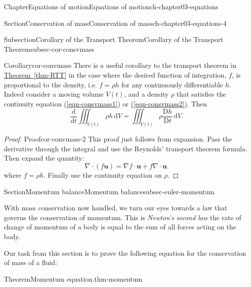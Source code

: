 \documentclass[oneside,10pt,]{book}
\newcommand{\xreffont}{\relax}
\numberwithin{equation}{section}
\newcommand{\de}{\mathrm{d}}
\newcommand{\dd}[2]{\frac{\de#1}{\de#2}}
\newcommand{\DD}[2]{\frac{\mathrm{D}#1}{\mathrm{D}#2}}
\newcommand{\bu}{\boldsymbol{u}}
\begin{document}
\begin{chapterptx}{Chapter}{Equations of motion}{}{Equations of motion}{}{}{ch-chapter03-equations}
\begin{sectionptx}{Section}{Conservation of mass}{}{Conservation of mass}{}{}{ch-chapter03-equations-4}
\typeout{************************************************}
%
\begin{subsectionptx}{Subsection}{Corollary of the Transport Theorem}{}{Corollary of the Transport Theorem}{}{}{subsec-cor-consvmass}
\begin{corollary}{Corollary}{}{}{cor-convmass}%
There is a useful corollary to the transport theorem in \hyperref[thm-RTT]{Theorem~{\xreffont\ref{thm-RTT}}} in the case where the desired function of integration, \(f\), is proportional to the density, i.e. \(f = \rho h\) for any continuously differentiable \(h\). Indeed consider a moving volume \(V(t)\), and a density \(\rho\) that satisfies the continuity equation \hyperref[eqn-consvmass1]{({\xreffont\ref{eqn-consvmass1}})} or \hyperref[eqn-consvmass2]{({\xreffont\ref{eqn-consvmass2}})}. Then%
\begin{equation}
\dd{}{t} \iiint_{V(t)} \rho h \, \de{V} = \iiint_{V(t)} \rho \DD{h}{t} \, \de{V}.\label{eqn-cor-convmass}
\end{equation}
%
\end{corollary}
\begin{proof}{Proof}{}{cor-convmass-2}
This proof just follows from expansion. Pass the derivative through the integral and use the Reynolds' transport theorem formula. Then expand the quantity:%
\begin{equation*}
\nabla \cdot (f\bu) = \nabla f \cdot \bu + f \nabla \cdot \bu.
\end{equation*}
where \(f = \rho h\). Finally use the continuity equation on \(\rho\).%
\end{proof}
\end{subsectionptx}
\end{sectionptx}
%
%
\typeout{************************************************}
\typeout{************************************************}
%
\begin{sectionptx}{Section}{Momentum balance}{}{Momentum balance}{}{}{subsec-euler-momentum}
\begin{introduction}{}%
With mass conservation now handled, we turn our eyes towards a law that governs the conservation of momentum. This is \emph{Newton's second law} the rate of change of momentum of a body is equal to the sum of all forces acting on the body.%
\par
Our task from this section is to prove the following equation for the conservation of mass of a fluid:%
\begin{theorem}{Theorem}{Momentum equation.}{}{thm-momentum}%

\end{theorem}
\end{introduction}
\end{sectionptx}
\end{chapterptx}
\end{document}
